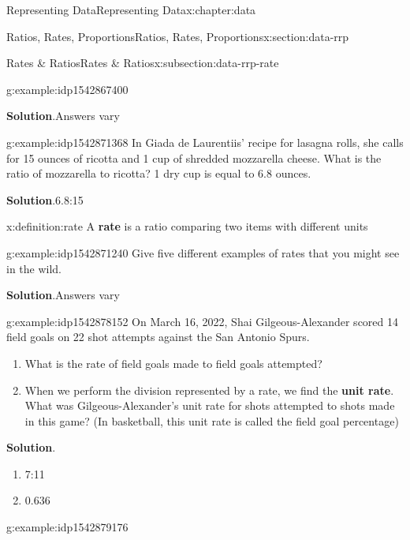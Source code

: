 \documentclass[oneside,10pt,]{book}
\newcommand{\blocktitlefont}{\relax}
\newcommand{\terminology}[1]{\textbf{#1}}
\begin{document}
\begin{chapterptx}{Representing Data}{}{Representing Data}{}{}{x:chapter:data}
\begin{sectionptx}{Ratios, Rates, Proportions}{}{Ratios, Rates, Proportions}{}{}{x:section:data-rrp}
\begin{subsectionptx}{Rates \& Ratios}{}{Rates \& Ratios}{}{}{x:subsection:data-rrp-rate}
\begin{example}{}{g:example:idp1542867400}
\par\smallskip%
\noindent\textbf{\blocktitlefont Solution}.\hypertarget{g:solution:idp1542866760}{}\quad{}Answers vary%
\end{example}
\begin{example}{}{g:example:idp1542871368}%
In Giada de Laurentiis' recipe for lasagna rolls, she calls for 15 ounces of ricotta and 1 cup of shredded mozzarella cheese.  What is the ratio of mozzarella to ricotta?  1 dry cup is equal to 6.8 ounces.%
\par\smallskip%
\noindent\textbf{\blocktitlefont Solution}.\hypertarget{g:solution:idp1542866632}{}\quad{}6.8:15%
\end{example}
\begin{definition}{}{x:definition:rate}%
A \terminology{rate} is a ratio comparing two items with different units%
%
\end{definition}
\begin{example}{}{g:example:idp1542871240}%
Give five different examples of rates that you might see in the wild.%
\par\smallskip%
\noindent\textbf{\blocktitlefont Solution}.\hypertarget{g:solution:idp1542867784}{}\quad{}Answers vary%
\end{example}
\begin{example}{}{g:example:idp1542878152}%
On March 16, 2022, Shai Gilgeous-Alexander scored 14 field goals on 22 shot attempts against the San Antonio Spurs.%
\par
%
\begin{enumerate}[label=\alph*]
\item{}What is the rate of field goals made to field goals attempted?%
\item{}When we perform the division represented by a rate, we find the \terminology{unit rate}.  What was Gilgeous-Alexander's unit rate for shots attempted to shots made in this game?  (In basketball, this unit rate is called the field goal percentage)%
\end{enumerate}
%
\par\smallskip%
\noindent\textbf{\blocktitlefont Solution}.\hypertarget{g:solution:idp1542882632}{}\quad{}%
\begin{enumerate}[label=\alph*]
\item{}7:11%
\item{}0.636%
\end{enumerate}
%
\end{example}
\begin{example}{}{g:example:idp1542879176}%

\end{example}
\end{subsectionptx}
\end{sectionptx}
\end{chapterptx}
\end{document}
